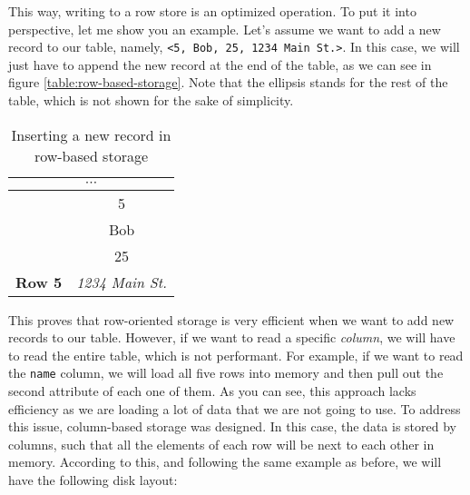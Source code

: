 This way, writing to a row store is an optimized operation. To put it into perspective, let me show you an example. Let's assume we want to add a new record to our table, namely, \texttt{<5, Bob, 25, 1234 Main St.>}. In this case, we will just have to append the new record at the end of the table, as we can see in figure \ref{table:row-based-storage}. Note that the ellipsis stands for the rest of the table, which is not shown for the sake of simplicity.

\begin{table}[ht]
    \centering
    \begin{tabular}{|c|c|}
        \hline
        \multicolumn{2}{|c|}{$\cdots$}                                                    \\ \hline
        \cellcolor[HTML]{EFEFEF}                                 & 5                      \\ \cline{2-2}
        \cellcolor[HTML]{EFEFEF}                                 & Bob                    \\ \cline{2-2}
        \cellcolor[HTML]{EFEFEF}                                 & 25                     \\ \cline{2-2}
        \multirow{-4}{*}{\cellcolor[HTML]{EFEFEF}\textbf{Row 5}} & \textit{1234 Main St.} \\ \hline
    \end{tabular}
    \caption{Inserting a new record in row-based storage}
\end{table}
\label{table:row-based-storage}

This proves that row-oriented storage is very efficient when we want to add new records to our table. However, if we want to read a specific \textit{column}, we will have to read the entire table, which is not performant. For example, if we want to read the \texttt{name} column, we will load all five rows into memory and then pull out the second attribute of each one of them. As you can see, this approach lacks efficiency as we are loading a lot of data that we are not going to use. To address this issue, column-based storage was designed. In this case, the data is stored by columns, such that all the elements of each row will be next to each other in memory. According to this, and following the same example as before, we will have the following disk layout:

